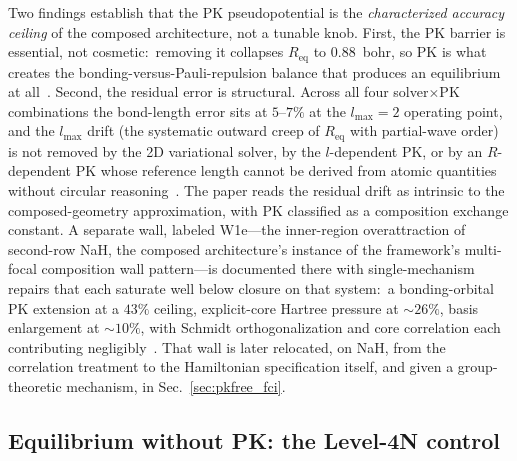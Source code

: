 \documentclass[aps,pra,twocolumn,superscriptaddress,longbibliography]{revtex4-2}
\begin{document}
Two findings establish that the PK pseudopotential is the
\emph{characterized accuracy ceiling} of the composed architecture, not
a tunable knob.  First, the PK barrier is essential, not cosmetic:\
removing it collapses $R_{\mathrm{eq}}$ to $0.88$~bohr, so PK is what
creates the bonding-versus-Pauli-repulsion balance that produces an
equilibrium at all~\cite{loutey_paper17}.  Second, the residual error
is structural.  Across all four solver$\times$PK combinations the
bond-length error sits at $5$--$7\%$ at the $l_{\max}=2$
operating point, and the $l_{\max}$ drift (the systematic outward
creep of $R_{\mathrm{eq}}$ with partial-wave order) is not removed by
the 2D variational solver, by the $l$-dependent PK, or by an
$R$-dependent PK whose reference length cannot be derived from atomic
quantities without circular reasoning~\cite{loutey_paper17}.  The paper
reads the residual drift as intrinsic to the composed-geometry
approximation, with PK classified as a composition exchange constant.
A separate wall, labeled W1e---the inner-region overattraction of
second-row NaH, the composed
architecture's instance of the framework's multi-focal composition wall
pattern---is documented there with single-mechanism repairs that each saturate
well below closure on that system:\ a bonding-orbital PK extension at a $43\%$ ceiling,
explicit-core Hartree pressure at $\sim\!26\%$, basis enlargement at
$\sim\!10\%$, with Schmidt orthogonalization and core correlation each
contributing negligibly~\cite{loutey_paper17}.  That wall is later
relocated, on NaH, from the correlation treatment to the Hamiltonian specification
itself, and given a group-theoretic mechanism, in
Sec.~\ref{sec:pkfree_fci}.

\subsection{Equilibrium without PK: the Level-4N control}
\end{document}
